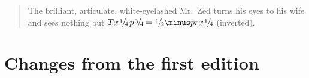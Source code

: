 \def\frac#1/#2{\leavevmode\kern.1em
  \raise.5ex\hbox{\the\scriptfont0 #1}\kern-.1em
  /\kern-.15em\lower.25ex\hbox{\the\scriptfont0 #2}}

\begin{quotation}
	\new The brilliant, articulate, white-eyelashed
	Mr.~Zed turns his
	eyes to his wife and sees nothing but
	$\mit T x \frac1/4 \, p \frac3/4 
		= \frac1/2 \minus p r x \frac1/4$ (inverted).
\end{quotation}
\unskip\newpage
	
\chapter*{Changes from the first edition}

